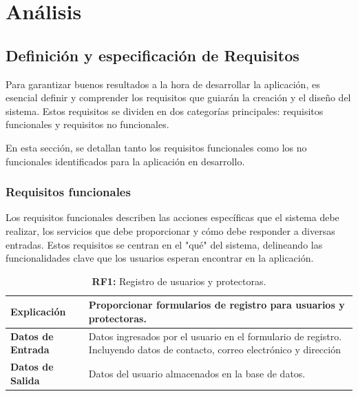 \documentclass[a4paper, 12pt]{article}
\begin{document}
\newpage
\section{Análisis}

\subsection{Definición y especificación de Requisitos}

Para garantizar buenos resultados a la hora de desarrollar la aplicación, es esencial definir y comprender los requisitos que guiarán la creación y el diseño del sistema. Estos requisitos se dividen en dos categorías principales: requisitos funcionales y requisitos no funcionales.

En esta sección, se detallan tanto los requisitos funcionales como los no funcionales identificados para la aplicación en desarrollo. 

\subsubsection{Requisitos funcionales}

Los requisitos funcionales describen las acciones específicas que el sistema debe realizar, los servicios que debe proporcionar y cómo debe responder a diversas entradas. Estos requisitos se centran en el "qué" del sistema, delineando las funcionalidades clave que los usuarios esperan encontrar en la aplicación.

\begin{table}[H]
\captionsetup{justification=raggedright,singlelinecheck=false}
\caption{\textbf{RF1:} Registro de usuarios y protectoras.}
\label{tab:RF1}
	\begin{tabular}{|m{5cm}|m{10cm}|}
	\hline
	\textbf{Explicación} & Proporcionar formularios de registro para usuarios y protectoras. \\ 
	\hline
	\textbf{Datos de Entrada} & Datos ingresados por el usuario en el formulario de registro. Incluyendo datos de contacto, correo electrónico y dirección \\ 
	\hline
	\textbf{Datos de Salida} & Datos del usuario almacenados en la base de datos. \\ 
	\hline
\end{tabular}
\end{table}
\end{document}
